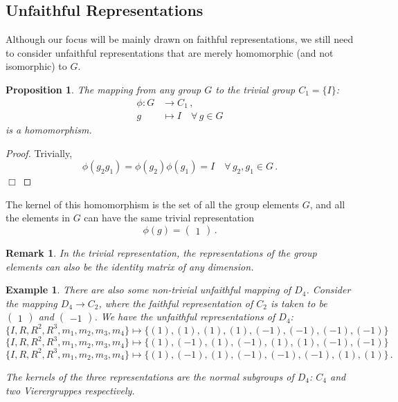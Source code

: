 \documentclass{article}
\theoremstyle{plain}\theoremheaderfont{\normalfont\itshape}\theorembodyfont{\rmfamily}\theoremseparator{.}\newtheorem*{rem}{Remark}\newtheorem*{ex}{Example}\newtheorem*{proof}{Proof}\newtheorem*{altp}{Alternative proof}
\theoremstyle{plain}\theoremheaderfont{\normalfont\bfseries}\theorembodyfont{\rmfamily}\theoremseparator{.}\newtheorem{thm}{Theorem}[section]\newtheorem{lem}[thm]{Lemma}\newtheorem{prop}[thm]{Proposition}\newtheorem*{cor}{Corollary}\newtheorem{defn}[thm]{Definition}\newtheorem{clm}[thm]{Claim}\newtheorem{clminproof}{Claim}
\theoremstyle{break}\theoremheaderfont{\normalfont\itshape}\theorembodyfont{\rmfamily}\theoremseparator{.\medskip}\newtheorem*{proofskip}{Proof}\newtheorem*{exs}{Examples}\newtheorem*{rems}{Remarks}
\theoremstyle{break}\theoremheaderfont{\normalfont\bfseries}\theorembodyfont{\rmfamily}\theoremseparator{.\medskip}\newtheorem{lemskip}[thm]{Lemma}\newtheorem{defnskip}[thm]{Definition}\newtheorem{propskip}[thm]{Proposition}\newtheorem{thmskip}[thm]{Theorem}
\numberwithin{equation}{section}
\newcommand{\qed}{\hfill\ensuremath{\Box}}
\begin{document}
	\subsection{Unfaithful Representations}
	Although our focus will be mainly drawn on faithful representations, we still need to consider unfaithful representations that are merely homomorphic (and not isomorphic) to \(G\).
	\begin{prop}
		The mapping from any group \(G\) to the trivial group \(C_1=\{I\}\):
		\begin{align*}
			\phi:G&\to C_1\,,\\
			g&\mapsto I\quad\forall\,g\in G
		\end{align*}
		is a homomorphism.
	\end{prop}
	\begin{proof}
		Trivially,
		\[\phi(g_2g_1)=\phi(g_2)\phi(g_1)=I\quad\forall\,g_2,g_1\in G\,.\]\qed
	\end{proof}
	The kernel of this homomorphism is the set of all the group elements \(G\), and all the elements in \(G\) can have the same trivial representation
	\[\phi(g)=\begin{pmatrix}
		1
	\end{pmatrix}\,.\]
	\begin{rem}
		In the trivial representation, the representations of the group elements can also be the identity matrix of any dimension.
	\end{rem}
	\begin{ex}
		There are also some non-trivial unfaithful mapping of \(D_4\). Consider the mapping \(D_4\to C_2\), where the faithful representation of \(C_2\) is taken to be \(\begin{pmatrix}
			1
		\end{pmatrix}\) and \(\begin{pmatrix}
			-1
		\end{pmatrix}\). We have the unfaithful representations of \(D_4\):
		\[\{I,R,R^2,R^3,m_1,m_2,m_3,m_4\}\mapsto\{(1),(1),(1),(1),(-1),(-1),(-1),(-1)\}\]
		\[\{I,R,R^2,R^3,m_1,m_2,m_3,m_4\}\mapsto\{(1),(-1),(1),(-1),(1),(1),(-1),(-1)\}\]
		\[\{I,R,R^2,R^3,m_1,m_2,m_3,m_4\}\mapsto\{(1),(-1),(1),(-1),(-1),(-1),(1),(1)\}\,.\]

		The kernels of the three representations are the normal subgroups of \(D_4\): \(C_4\) and two Vierergruppes respectively.
	\end{ex}
	
\end{document}
